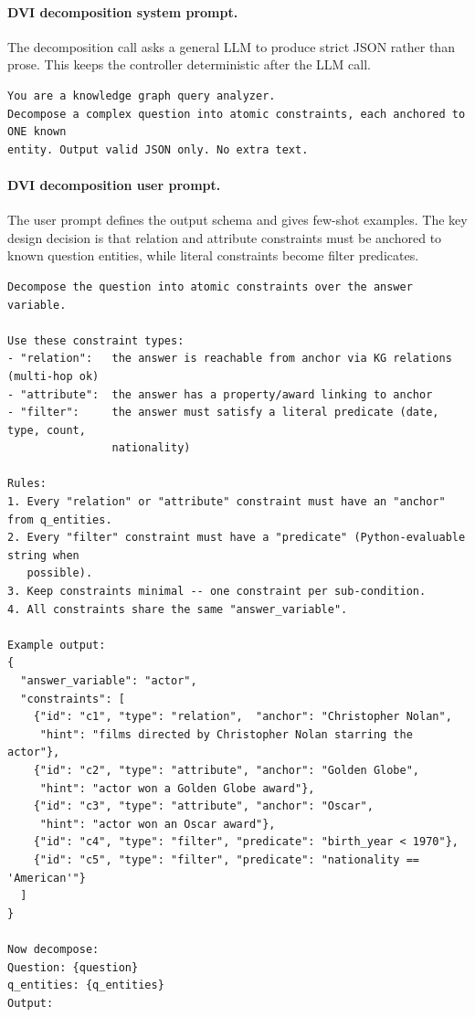 \documentclass[10pt,twocolumn]{article}
\begin{document}
\paragraph{DVI decomposition system prompt.}
The decomposition call asks a general LLM to produce strict JSON rather than prose. This keeps the controller deterministic after the LLM call.
\begin{verbatim}
You are a knowledge graph query analyzer.
Decompose a complex question into atomic constraints, each anchored to ONE known
entity. Output valid JSON only. No extra text.
\end{verbatim}

\paragraph{DVI decomposition user prompt.}
The user prompt defines the output schema and gives few-shot examples. The key design decision is that relation and attribute constraints must be anchored to known question entities, while literal constraints become filter predicates.
\begin{verbatim}
Decompose the question into atomic constraints over the answer variable.

Use these constraint types:
- "relation":   the answer is reachable from anchor via KG relations (multi-hop ok)
- "attribute":  the answer has a property/award linking to anchor
- "filter":     the answer must satisfy a literal predicate (date, type, count,
                nationality)

Rules:
1. Every "relation" or "attribute" constraint must have an "anchor" from q_entities.
2. Every "filter" constraint must have a "predicate" (Python-evaluable string when
   possible).
3. Keep constraints minimal -- one constraint per sub-condition.
4. All constraints share the same "answer_variable".

Example output:
{
  "answer_variable": "actor",
  "constraints": [
    {"id": "c1", "type": "relation",  "anchor": "Christopher Nolan",
     "hint": "films directed by Christopher Nolan starring the actor"},
    {"id": "c2", "type": "attribute", "anchor": "Golden Globe",
     "hint": "actor won a Golden Globe award"},
    {"id": "c3", "type": "attribute", "anchor": "Oscar",
     "hint": "actor won an Oscar award"},
    {"id": "c4", "type": "filter", "predicate": "birth_year < 1970"},
    {"id": "c5", "type": "filter", "predicate": "nationality == 'American'"}
  ]
}

Now decompose:
Question: {question}
q_entities: {q_entities}
Output:
\end{verbatim}
\end{document}

